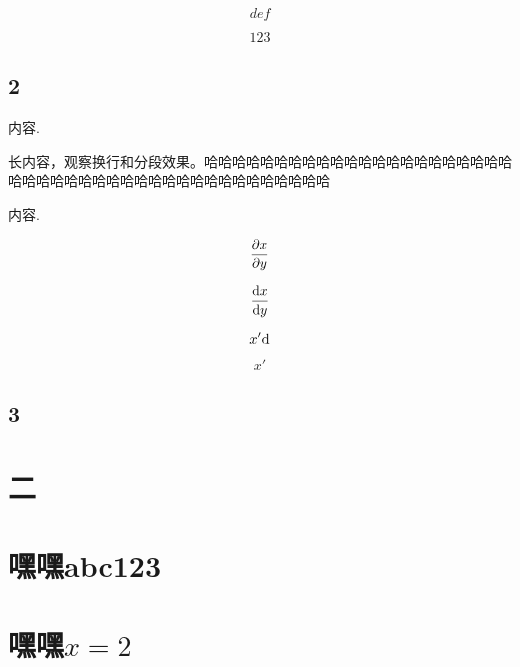 \documentclass[zihao=-4,fontset=windows]{MyBeautybook-CN}
\begin{document}
    \begin{property}
        \begin{equation}
            def
        \end{equation}
    \end{property}

    \begin{property}
        \begin{equation}
            123
        \end{equation}
    \end{property}

    \section{2}

    \begin{note}
        内容.

        \indent 长内容，观察换行和分段效果。哈哈哈哈哈哈哈哈哈哈哈哈哈哈哈哈哈哈哈哈哈哈哈哈哈哈哈哈哈哈哈哈哈哈哈哈哈哈哈哈哈哈哈哈哈 \supercite{Huybrechts2010Complex}
    \end{note}

    \begin{axiom}
        内容.

        $$
        \Diff[x]{y}
        $$

        $$
        \Dif{x}{y}
        $$

        $$
        x\pr \dd
        $$

        $$
        x'
        $$
    \end{axiom}

    \section{3}

    \let\cleardoublepage\clearpage

    \chapter{二}

    \chapter{嘿嘿abc123}

    \chapter{嘿嘿\texorpdfstring{$x=2$}{}}

    \backmatter
    \appendix %

    \normalem
    \printbibliography[
        heading = bibintoc,
        title = {参考文献}
    ]
    \printindex
    \thispagestyle{empty}
\end{document}
